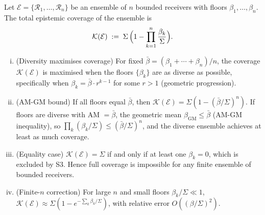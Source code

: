 \begin{theorem}
\label{thm:ch02-distribution-extended}
Let $\mathcal{E} = \{\mathcal{R}_1, \ldots, \mathcal{R}_n\}$ be an ensemble of
$n$ bounded receivers with floors $\beta_1, \ldots, \beta_n$.  The total
epistemic coverage of the ensemble is
\[
  \mathcal{K}(\mathcal{E})
  \;:=\;
  \Sigma\,\Bigl(1 - \prod_{k=1}^n \frac{\beta_k}{\Sigma}\Bigr).
\]
\begin{enumerate}[(i)]
  \item (Diversity maximises coverage) For fixed $\bar\beta = (\beta_1 +
    \cdots + \beta_n)/n$, the coverage $\mathcal{K}(\mathcal{E})$ is maximised
    when the floors $\{\beta_k\}$ are as diverse as possible, specifically when
    $\beta_k = \bar\beta \cdot r^{k-1}$ for some $r > 1$ (geometric progression).
  \item (AM-GM bound) If all floors equal $\bar\beta$, then
    $\mathcal{K}(\mathcal{E}) = \Sigma(1 - (\bar\beta/\Sigma)^n)$.  If floors
    are diverse with AM $= \bar\beta$, the geometric mean
    $\beta_{\mathrm{GM}} \leq \bar\beta$ (AM-GM inequality), so
    $\prod_k(\beta_k/\Sigma) \leq (\bar\beta/\Sigma)^n$, and the diverse
    ensemble achieves at least as much coverage.
  \item (Equality case) $\mathcal{K}(\mathcal{E}) = \Sigma$ if and only if
    at least one $\beta_k = 0$, which is excluded by S3.  Hence full coverage
    is impossible for any finite ensemble of bounded receivers.
  \item (Finite-$n$ correction) For large $n$ and small floors
    $\beta_k/\Sigma \ll 1$, $\mathcal{K}(\mathcal{E}) \approx
    \Sigma(1 - e^{-\sum_k \beta_k/\Sigma})$, with relative error $O((\beta/\Sigma)^2)$.
\end{enumerate}
\end{theorem}


